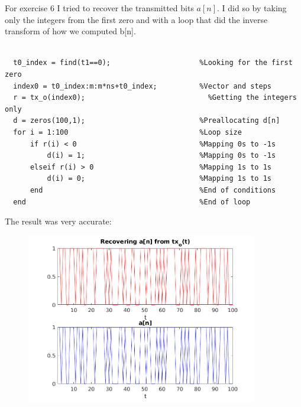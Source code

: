 \documentclass[a4paper,11pt]{article}
\begin{document}
\newpage

For exercise 6 I tried to recover the transmitted bits $a[n]$. I did so by
taking only the integers from the first zero and with a loop that did the
inverse transform of how we computed b[n].

\bigskip

\begin{lstlisting}

  t0_index = find(t1==0);                     %Looking for the first zero
  index0 = t0_index:m:m*ns+t0_index;          %Vector and steps
  r = tx_o(index0);                         	%Getting the integers only
  d = zeros(100,1);                           %Preallocating d[n]
  for i = 1:100                               %Loop size
      if r(i) < 0                             %Mapping 0s to -1s
          d(i) = 1;                           %Mapping 0s to -1s
      elseif r(i) > 0                         %Mapping 1s to 1s
          d(i) = 0;                           %Mapping 1s to 1s
      end                                     %End of conditions
  end                                         %End of loop

\end{lstlisting}

\bigskip

The result was very accurate:

\begin{figure}[!hp]
    \begin{center}
      \includegraphics[width=0.9\textwidth]{images/exercise6.png}
    \end{center}
\end{figure}
\end{document}
